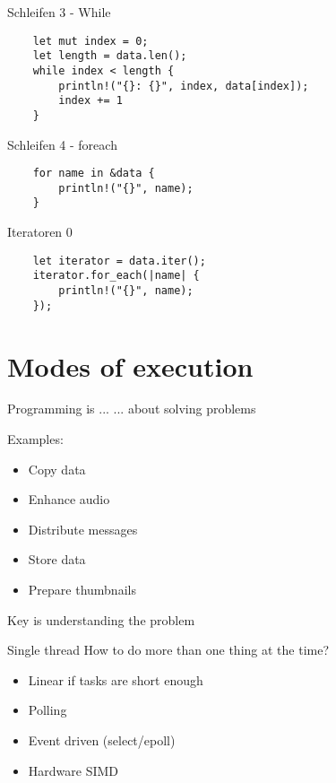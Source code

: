 \documentclass[aspectratio=1610,t]{beamer}
\begin{document}
\begin{frame}[fragile]{Schleifen 3 - While}
\begin{verbatim}
    let mut index = 0;
    let length = data.len();
    while index < length {
        println!("{}: {}", index, data[index]);
        index += 1
    }
\end{verbatim}
\end{frame}

\begin{frame}[fragile]{Schleifen 4 - foreach}
\begin{verbatim}
    for name in &data {
        println!("{}", name);
    }
\end{verbatim}
\end{frame}

\begin{frame}[fragile]{Iteratoren 0}
\begin{verbatim}
    let iterator = data.iter();
    iterator.for_each(|name| {
        println!("{}", name);
    });
\end{verbatim}
\end{frame}

{
\section{Modes of execution}
}

\begin{frame}[fragile]{Programming is ...}
... about solving problems

Examples:
\begin{itemize}
  \item Copy data
  \item Enhance audio
  \item Distribute messages
  \item Store data
  \item Prepare thumbnails
\end{itemize}

Key is understanding the problem
\end{frame}

\begin{frame}[fragile]{Single thread}
How to do more than one thing at the time?

\begin{itemize}
  \item Linear if tasks are short enough
  \item Polling
  \item Event driven (select/epoll)
  \item Hardware SIMD
\end{itemize}
\end{frame}
\end{document}
